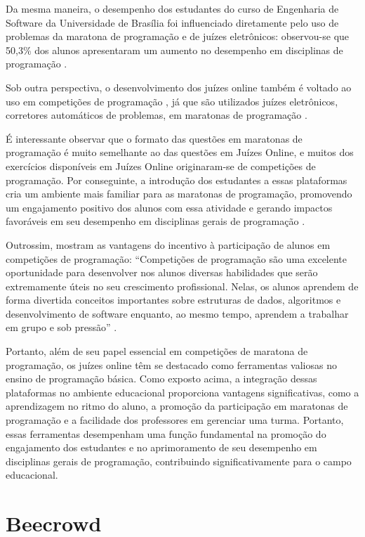 Da mesma maneira, o desempenho dos estudantes do curso de Engenharia de Software da Universidade de Brasília foi influenciado diretamente pelo uso de problemas da maratona de programação e de juízes eletrônicos: observou-se que 50,3\% dos alunos apresentaram um aumento no desempenho em disciplinas de programação \cite[p.~218]{salescosta}.

Sob outra perspectiva, o desenvolvimento dos juízes online também é voltado ao uso em competições de programação \cite[p.~964-965]{santosribeiro}, já que são utilizados juízes eletrônicos, corretores automáticos de problemas, em maratonas de programação \cite[p.~34]{lima2023}. 

É interessante observar que o formato das questões em maratonas de programação é muito semelhante ao das questões em Juízes Online, e muitos dos exercícios disponíveis em Juízes Online originaram-se de competições de programação. Por conseguinte, a introdução dos estudantes a essas plataformas cria um ambiente mais familiar para as maratonas de programação, promovendo um engajamento positivo dos alunos com essa atividade e gerando impactos favoráveis em seu desempenho em disciplinas gerais de programação \cite[p.~33-34]{lima2023}.

Outrossim, \textcite[p.~2]{camposferreira} mostram as vantagens do incentivo à participação de alunos em competições de programação: “Competições de programação são uma excelente oportunidade para desenvolver nos alunos diversas habilidades que serão extremamente úteis no seu crescimento profissional. Nelas, os alunos aprendem de forma divertida conceitos importantes sobre estruturas de dados, algoritmos e desenvolvimento de software enquanto, ao mesmo tempo, aprendem a trabalhar em grupo e sob pressão” \cite[p.~2]{camposferreira}.

Portanto, além de seu papel essencial em competições de maratona de programação, os juízes online têm se destacado como ferramentas valiosas no ensino de programação básica. Como exposto acima, a integração dessas plataformas no ambiente educacional proporciona vantagens significativas, como a aprendizagem no ritmo do aluno, a promoção da participação em maratonas de programação e a facilidade dos professores em gerenciar uma turma. Portanto, essas ferramentas desempenham uma função fundamental na promoção do engajamento dos estudantes e no aprimoramento de seu desempenho em disciplinas gerais de programação, contribuindo significativamente para o campo educacional.


\section{Beecrowd}

